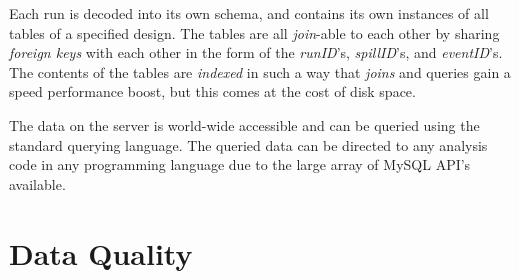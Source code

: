 Each run is decoded into its own schema, and contains its own instances of all tables of a specified design. The tables are all \emph{join}-able to each other by sharing \emph{foreign keys} with each other in the form of the \emph{runID}'s, \emph{spillID}'s, and \emph{eventID}'s. The contents of the tables are \emph{indexed} in such a way that \emph{joins} and queries gain a speed performance boost, but this comes at the cost of disk space.

The data on the server is world-wide accessible and can be queried using the standard querying language. The queried data can be directed to any analysis code in any programming language due to the large array of MySQL API's available.

\section{Data Quality}

